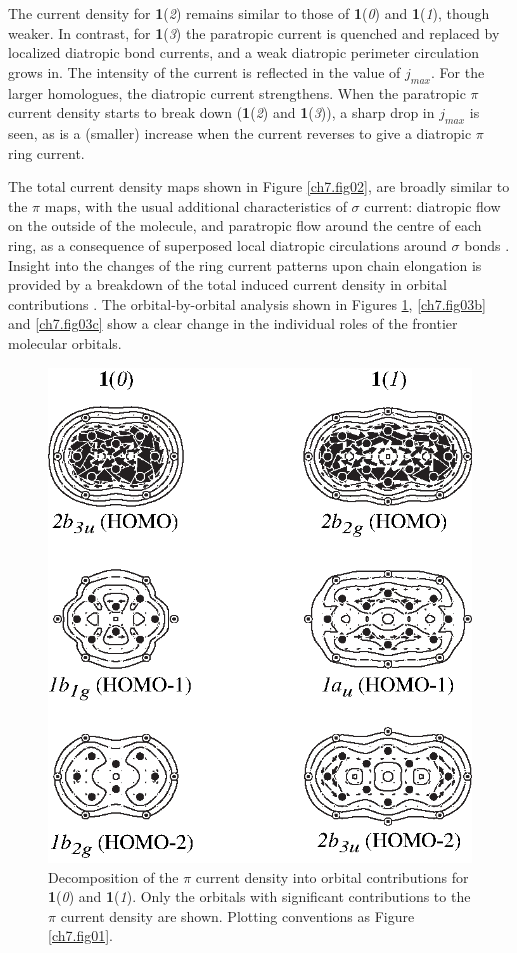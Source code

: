 The current density for \textbf{1}(\textit{2}) remains similar to those of \textbf{1}(\textit{0}) and \textbf{1}(\textit{1}), though weaker. In contrast, for \textbf{1}(\textit{3}) the paratropic current is quenched and replaced by localized diatropic bond currents, and a weak diatropic perimeter circulation grows in. The intensity of the current is reflected in the value of $j_{max}$. For the larger homologues, the diatropic current strengthens. When the paratropic $\pi$ current density starts to break down (\textbf{1}(\textit{2}) and \textbf{1}(\textit{3})), a sharp drop in $j_{max}$ is seen, as is a (smaller) increase when the current reverses to give a diatropic $\pi$ ring current.

The total current density maps shown in Figure \ref{ch7.fig02}, are broadly similar to the $\pi$ maps, with the usual additional characteristics of $\sigma$ current: diatropic flow on the outside of the molecule, and paratropic flow around the centre of each ring, as a consequence of superposed local diatropic circulations around $\sigma$ bonds \cite{r18}. Insight into the changes of the ring current patterns upon chain elongation is provided by a breakdown of the total induced current density in orbital contributions  \cite{r35,r36}.
\clearpage
\newpage
The orbital-by-orbital analysis shown in Figures \ref{ch7.fig03a}, \ref{ch7.fig03b} and \ref{ch7.fig03c}  show a clear change in the individual roles of the frontier molecular orbitals.
\begin{figure}[htp]
\center
\includegraphics{indacene/figures/figure3a.eps}
\caption{Decomposition of the $\pi$ current density into orbital contributions for \textbf{1}(\textit{0}) and \textbf{1}(\textit{1}). Only the orbitals with significant contributions to the $\pi$ current density are shown. Plotting conventions as Figure \ref{ch7.fig01}.}
\label{ch7.fig03a}
\end{figure}
